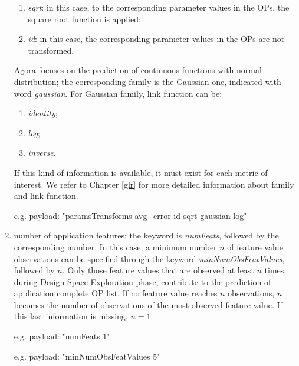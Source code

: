 \begin{enumerate}
\begin{enumerate}
        \item \textit{sqrt}: in this case, to the corresponding parameter values in the OPs, the square root function is applied;
        
        \item \textit{id}: in this case, the corresponding parameter values in the OPs are not transformed.
    
    \end{enumerate}
    
    Agora focuses on the prediction of continuous functions with normal distribution; the corresponding family is the Gaussian one, indicated with word \textit{gaussian}. For Gaussian family, link function can be:
    
    \begin{enumerate}
    
        \item \textit{identity};
        
        \item \textit{log};
        
        \item \textit{inverse}.
    
    \end{enumerate}
    
    If this kind of information is available, it must exist for each metric of interest. We refer to Chapter \ref{glr} for more detailed information about family and link function.
    
    e.g. payload: "paramsTransforms avg\_error id sqrt gaussian log"
    
    \item number of application features: the keyword is \textit{numFeats}, followed by the corresponding number. In this case, a minimum number $n$ of feature value observations can be specified through the keyword \textit{minNumObsFeatValues}, followed by $n$. Only those feature values that are observed at least $n$ times, during Design Space Exploration phase, contribute to the prediction of application complete OP list. If no feature value reaches $n$ observations, $n$ becomes the number of observations of the most observed feature value. If this last information is missing, $n = 1$.
    
    e.g. payload: "numFeats 1"
    
    e.g. payload: "minNumObsFeatValues 5"

\end{enumerate}

